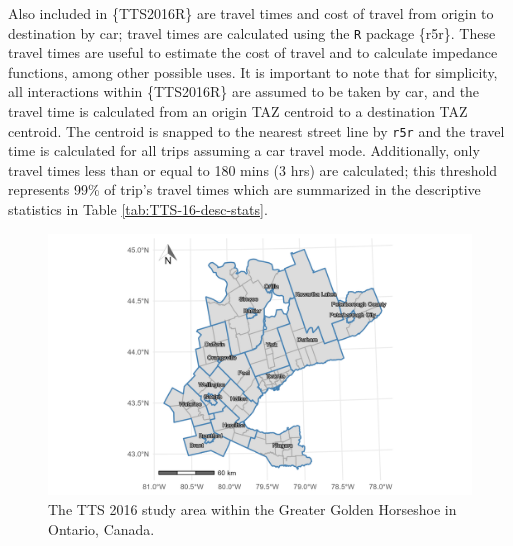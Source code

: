 \documentclass[Royal,times,sageh]{sagej}
\begin{document}
Also included in \{TTS2016R\} are travel times and cost of travel from
origin to destination by car; travel times are calculated using the
\texttt{R} package \{r5r\}. These travel times are useful to estimate
the cost of travel and to calculate impedance functions, among other
possible uses. It is important to note that for simplicity, all
interactions within \{TTS2016R\} are assumed to be taken by car, and the
travel time is calculated from an origin TAZ centroid to a destination
TAZ centroid. The centroid is snapped to the nearest street line by
\texttt{r5r} and the travel time is calculated for all trips assuming a
car travel mode. Additionally, only travel times less than or equal to
180 mins (3 hrs) are calculated; this threshold represents 99\% of
trip's travel times which are summarized in the descriptive statistics
in Table \ref{tab:TTS-16-desc-stats}.

\begin{figure}

{\centering \includegraphics[width=0.8\linewidth]{images/TTS16-survey-area} 

}

\caption{\label{fig:TTS-16-survey-area}The TTS 2016 study area within the Greater Golden Horseshoe in Ontario, Canada.}\label{fig:TTS-16-survey-area}
\end{figure}
\end{document}
